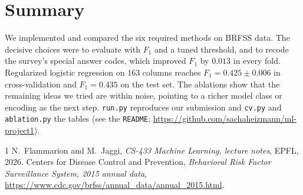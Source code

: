 \documentclass[10pt,conference,compsocconf]{IEEEtran}
\begin{document}
\section{Summary}

We implemented and compared the six required methods on BRFSS data. The
decisive choices were to evaluate with $F_1$ and a tuned threshold, and
to recode the survey's special answer codes, which improved $F_1$ by
$0.013$ in every fold. Regularized logistic regression on $163$ columns
reaches $F_1=0.425\pm0.006$ in cross-validation and $F_1=0.435$ on the
test set. The ablations show that the remaining ideas we
tried are within noise, pointing to a richer model class or encoding as
the next step. \texttt{run.py} reproduces our submission and
\texttt{cv.py} and \texttt{ablation.py} the tables (see the
\texttt{README}; \url{https://github.com/sachaheizmann/ml-project1}).

\begin{thebibliography}{1}
 N.~Flammarion and M.~Jaggi, \emph{CS-433 Machine
  Learning, lecture notes}, EPFL, 2026.
 Centers for Disease Control and Prevention,
  \emph{Behavioral Risk Factor Surveillance System, 2015 annual data},
  \url{https://www.cdc.gov/brfss/annual_data/annual_2015.html}.
\end{thebibliography}
\end{document}
